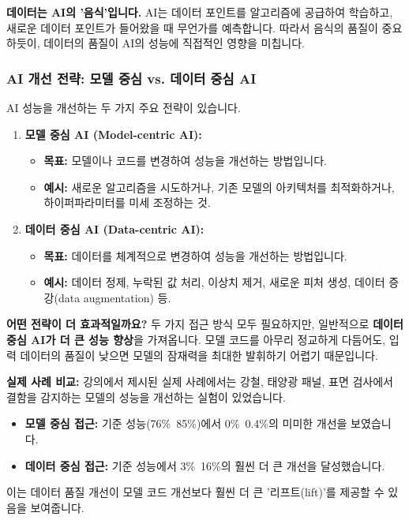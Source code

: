 \documentclass[11pt,a4paper]{article}
\theoremstyle{definition}
\begin{document}
\begin{tipbox}
\textbf{데이터는 AI의 '음식'입니다.}
AI는 데이터 포인트를 알고리즘에 공급하여 학습하고, 새로운 데이터 포인트가 들어왔을 때 무언가를 예측합니다. 따라서 음식의 품질이 중요하듯이, 데이터의 품질이 AI의 성능에 직접적인 영향을 미칩니다.
\end{tipbox}

\subsubsection{AI 개선 전략: 모델 중심 vs. 데이터 중심 AI}
AI 성능을 개선하는 두 가지 주요 전략이 있습니다.

\begin{enumerate}
    \item \textbf{모델 중심 AI (Model-centric AI):}
    \begin{itemize}
        \item \textbf{목표:} 모델이나 코드를 변경하여 성능을 개선하는 방법입니다.
        \item \textbf{예시:} 새로운 알고리즘을 시도하거나, 기존 모델의 아키텍처를 최적화하거나, 하이퍼파라미터를 미세 조정하는 것.
    \end{itemize}

    \item \textbf{데이터 중심 AI (Data-centric AI):}
    \begin{itemize}
        \item \textbf{목표:} 데이터를 체계적으로 변경하여 성능을 개선하는 방법입니다.
        \item \textbf{예시:} 데이터 정제, 누락된 값 처리, 이상치 제거, 새로운 피처 생성, 데이터 증강(data augmentation) 등.
    \end{itemize}
\end{enumerate}

\begin{warningbox}
\textbf{어떤 전략이 더 효과적일까요?}
두 가지 접근 방식 모두 필요하지만, 일반적으로 \textbf{데이터 중심 AI가 더 큰 성능 향상}을 가져옵니다. 모델 코드를 아무리 정교하게 다듬어도, 입력 데이터의 품질이 낮으면 모델의 잠재력을 최대한 발휘하기 어렵기 때문입니다.
\end{warningbox}

\begin{examplebox}
\textbf{실제 사례 비교:}
강의에서 제시된 실제 사례에서는 강철, 태양광 패널, 표면 검사에서 결함을 감지하는 모델의 성능을 개선하는 실험이 있었습니다.
\begin{itemize}
    \item \textbf{모델 중심 접근:} 기준 성능(76\%~85\%)에서 0\%~0.4\%의 미미한 개선을 보였습니다.
    \item \textbf{데이터 중심 접근:} 기준 성능에서 3\%~16\%의 훨씬 더 큰 개선을 달성했습니다.
\end{itemize}
이는 데이터 품질 개선이 모델 코드 개선보다 훨씬 더 큰 '리프트(lift)'를 제공할 수 있음을 보여줍니다.
\end{examplebox}
\end{document}
